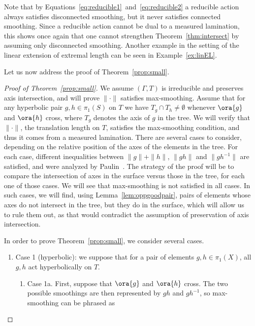 \begin{remark}
Note that by Equations~\ref{eq:reducible1}~and~\ref{eq:reducible2} a reducible action always satisfies disconnected smoothing, but it never satisfies connected smoothing. Since a reducible action cannot be dual to a measured lamination, this shows once again that one cannot strengthen Theorem~\ref{thm:intersect} by assuming only disconnected smoothing. Another example in the setting of the linear extension of extremal length can be seen in Example~\ref{ex:linEL}.
\label{rmk:reducible_action}
\end{remark}




Let us now address the proof of Theorem~\ref{prop:small}.

\begin{proof}[Proof of Theorem~\ref{prop:small}]
We assume $(\Gamma, T)$ is irreducible and preserves axis intersection, and will prove $\| \cdot \|$ satisfies max-smoothing. 
Assume that for any hyperbolic pair $g,h \in \pi_1(S)$ on $T$ we have $T_g \cap T_h \neq \emptyset$ whenever $\ora{g}$ and $\ora{h}$ cross, where $T_g$ denotes the axis of $g$ in the tree.
We will verify that $\| \cdot \|$, the translation length on $T$, satisfies the max-smoothing condition, and thus it comes from a measured lamination.
There are several cases to consider, depending on the relative position of the axes of the elements in the tree. For each case, different inequalities between $\| g\| + \| h \|$, $\| gh \|$ and $\| gh^{-1} \|$ are satisfied, and were analyzed by Paulin~\cite{Pa89:Paulin1989TheGT}. The strategy of the proof will be to compare the intersection of axes in the surface versus those in the tree, for each one of those cases.
We will see that max-smoothing is not satisfied in all cases. In such cases, we will find, using Lemma~\ref{lem:oppgoodpair}, pairs of elements whose axes do not intersect in the tree, but they do in the surface, which will allow us to rule them out, as that would contradict the assumption of preservation of axis intersection.

In order to prove Theorem~\ref{prop:small}, we consider several cases.

\begin{enumerate}[wide, labelindent=0pt]
\item Case 1 (hyperbolic): we suppose that for a pair of elements $g,h \in \pi_1(X)$, all $g,h$ act hyperbolically on $T$.
\begin{enumerate}
    \item Case 1a. First, suppose that $\ora{g}$ and $\ora{h}$ cross.
The two possible smoothings are then represented by $gh$ and $gh^{-1}$, so max-smoothing can be phrased as


\end{enumerate}
\end{enumerate}
\end{proof}
